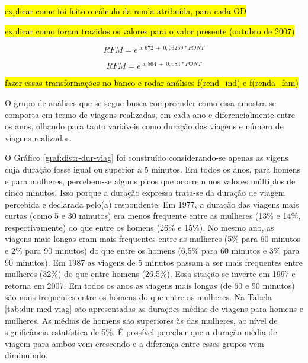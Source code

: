 \hl{explicar como foi feito o cálculo da renda atribuída, para cada OD}

\hl{explicar como foram trazidos os valores para o valor presente (outubro de 2007)}

\begin{equation}\label{eq:reg-renda-1997}
RFM = e^{~5,672~+~0,03259*PONT}
\end{equation}

\begin{equation}\label{eq:reg-renda-2007}
RFM = e^{~5,864~+~0,084*PONT}
\end{equation}

\hl{fazer essas transformações no banco e rodar análises f(rend\_ind) e f(renda\_fam)}

\clearpage
O grupo de análises que se segue busca compreender como essa amostra se comporta em termo de viagens realizadas, em cada ano e diferencialmente entre os anos, olhando para tanto variáveis como duração das viagens e número de viagens realizadas.


O Gráfico \ref{graf:distr-dur-viag} foi construído considerando-se apenas as vigens cuja duração fosse igual ou superior a 5 minutos. Em todos os anos, para homens e para mulheres, percebem-se alguns picos que ocorrem nos valores múltiplos de cinco minutos. Isso porque a duração expressa trata-se da duração de viagem percebida e declarada pelo(a) respondente. Em 1977, a duração das viagens mais curtas (como 5 e 30 minutos) era menos frequente entre as mulheres (13\% e 14\%, respectivamente) do que entre os homens (26\% e 15\%). No mesmo ano, as viagens mais longas eram mais frequentes entre as mulheres (5\% para 60 minutos e 2\% para 90 minutos) do que entre os homens (6,5\% para 60 minutos e 3\% para 90 minutos). Em 1987 as viagens de 5 minutos passam a ser mais frequentes entre mulheres (32\%) do que entre homens (26,5\%). Essa sitação se inverte em 1997 e retorna em 2007.
Em todos os anos as viagens mais longas (de 60 e 90 minutos) são mais frequentes entre os homens do que entre as mulheres.
Na Tabela \ref{tab:dur-med-viag} são apresentadas as durações médias de viagens para homens e mulheres. As médias de homens são superiores às das mulheres, ao nível de significância estatística de 5\%. É possível perceber que a duração média de viagem para ambos vem crescendo e a diferença entre esses grupos vem diminuindo.

